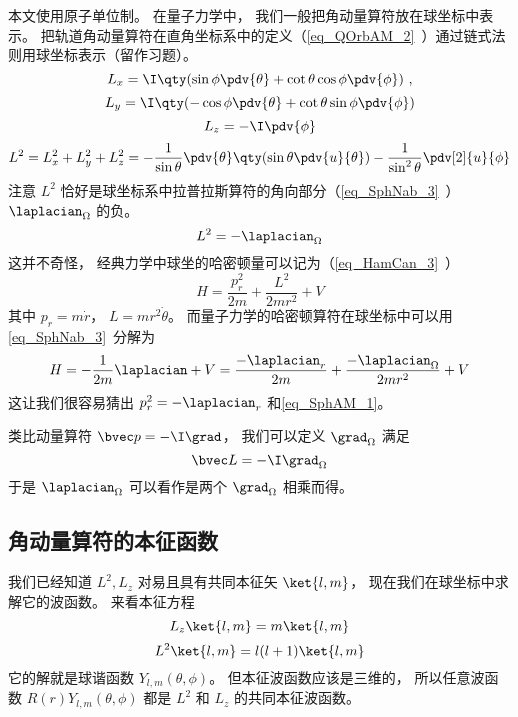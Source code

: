 

本文使用原子单位制。 在量子力学中， 我们一般把角动量算符放在球坐标中表示。 把轨道角动量算符在直角坐标系中的定义（\autoref{eq_QOrbAM_2}~）通过链式法则用球坐标表示（留作习题）。
\begin{equation}
L_x = \I \qty(\sin\phi\pdv{\theta} + \cot\theta\cos\phi\pdv{\phi})~,
\end{equation}
\begin{equation}
L_y = \I \qty(-\cos\phi\pdv{\theta} + \cot\theta \sin\phi \pdv{\phi})
\end{equation}
\begin{equation}
L_z = -\I\pdv{\phi}
\end{equation}
\begin{equation}
L^2 = L_x^2 + L_y^2 + L_z^2 = -\frac{1}{\sin\theta}\pdv{\theta} \qty(\sin \theta \pdv{u}{\theta}) - \frac{1}{\sin^2 \theta} \pdv[2]{u}{\phi}
\end{equation}
注意 $L^2$ 恰好是球坐标系中拉普拉斯算符的角向部分（\autoref{eq_SphNab_3}~） $\laplacian_\Omega$ 的负。
\begin{equation}\label{eq_SphAM_1}
L^2 = -\laplacian_\Omega
\end{equation}
这并不奇怪， 经典力学中球坐的哈密顿量可以记为（\autoref{eq_HamCan_3}~）
\begin{equation}
H = \frac{p_r^2}{2m} + \frac{L^2}{2mr^2} + V
\end{equation}
其中 $p_r = m\dot r$， $L = mr^2\dot\theta$。 而量子力学的哈密顿算符在球坐标中可以用\autoref{eq_SphNab_3}~分解为
\begin{equation}
H = -\frac{1}{2m}\laplacian + V = \frac{-\laplacian_r}{2m} +\frac{-\laplacian_\Omega}{2mr^2} + V
\end{equation}
这让我们很容易猜出 $p_r^2 = -\laplacian_r$ 和\autoref{eq_SphAM_1}。

类比动量算符 $\bvec p = -\I \grad$， 我们可以定义 $\grad_\Omega$ 满足
\begin{equation}
\bvec L = -\I \grad_\Omega
\end{equation}
于是 $\laplacian_\Omega$ 可以看作是两个 $\grad_\Omega$ 相乘而得。

\subsection{角动量算符的本征函数}
我们已经知道 $L^2, L_z$ 对易且具有共同本征矢 $\ket{l, m}$， 现在我们在球坐标中求解它的波函数。 来看本征方程
\begin{equation}
L_z \ket{l, m} = m\ket{l, m}
\end{equation}
\begin{equation}
L^2 \ket{l, m} = l(l+1)\ket{l, m}
\end{equation}
它的解就是球谐函数 $Y_{l,m}(\theta,\phi)$。 但本征波函数应该是三维的， 所以任意波函数 $R(r)Y_{l,m}(\theta, \phi)$ 都是 $L^2$ 和 $L_z$ 的共同本征波函数。
